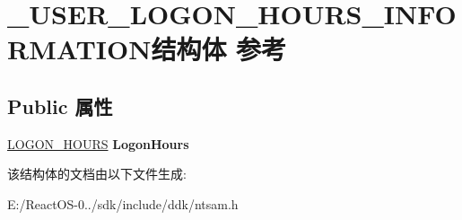 \hypertarget{struct___u_s_e_r___l_o_g_o_n___h_o_u_r_s___i_n_f_o_r_m_a_t_i_o_n}{}\section{\+\_\+\+U\+S\+E\+R\+\_\+\+L\+O\+G\+O\+N\+\_\+\+H\+O\+U\+R\+S\+\_\+\+I\+N\+F\+O\+R\+M\+A\+T\+I\+O\+N结构体 参考}
\label{struct___u_s_e_r___l_o_g_o_n___h_o_u_r_s___i_n_f_o_r_m_a_t_i_o_n}
\subsection*{Public 属性}
\begin{DoxyCompactItemize}
\item 
\mbox{\label{struct___u_s_e_r___l_o_g_o_n___h_o_u_r_s___i_n_f_o_r_m_a_t_i_o_n_ae899d88b09ea83e7df37f0c2bae09610}} 
\hyperlink{struct___l_o_g_o_n___h_o_u_r_s}{L\+O\+G\+O\+N\+\_\+\+H\+O\+U\+RS} {\bfseries Logon\+Hours}
\end{DoxyCompactItemize}


该结构体的文档由以下文件生成\+:\begin{DoxyCompactItemize}
\item 
E\+:/\+React\+O\+S-\/0../sdk/include/ddk/ntsam.\+h\end{DoxyCompactItemize}
